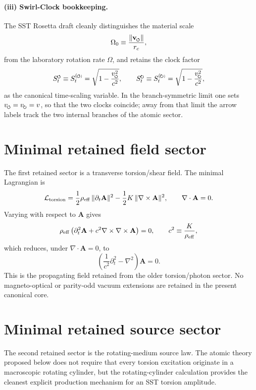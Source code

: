 \documentclass[11pt,a4paper]{article}
\newcommand{\swirlarrow}{\mathchoice{\mkern-2mu\scriptstyle\boldsymbol{\circlearrowleft}}{\mkern-2mu\scriptstyle\boldsymbol{\circlearrowleft}}{\mkern-2mu\scriptscriptstyle\boldsymbol{\circlearrowleft}}{\mkern-2mu\scriptscriptstyle\boldsymbol{\circlearrowleft}}}
\newcommand{\swirlarrowcw}{\mathchoice{\mkern-2mu\scriptstyle\boldsymbol{\circlearrowright}}{\mkern-2mu\scriptstyle\boldsymbol{\circlearrowright}}{\mkern-2mu\scriptscriptstyle\boldsymbol{\circlearrowright}}{\mkern-2mu\scriptscriptstyle\boldsymbol{\circlearrowright}}}
\newcommand{\vswirl}{\mathbf{v}_{\swirlarrow}}
\newcommand{\SwirlClock}{S_t^{\swirlarrow}}
\newcommand{\SwirlClockcw}{S_t^{\swirlarrowcw}}
\newcommand{\rc}{r_c}
\begin{document}
\paragraph{(iii) Swirl-Clock bookkeeping.} The SST Rosetta draft cleanly distinguishes the material scale
\begin{equation}
\label{eq:Omega0}
\Omega_0 \equiv \frac{\lVert \vswirl\rVert}{\rc},
\end{equation}
from the laboratory rotation rate $\Omega$, and retains the clock factor
\begin{equation}
\label{eq:SwirlClock}
\SwirlClock \equiv S_t^{(\swirlarrow)} = \sqrt{1-\frac{v_{\swirlarrow}^{2}}{c^2}},
\qquad
\SwirlClockcw \equiv S_t^{(\swirlarrowcw)} = \sqrt{1-\frac{v_{\swirlarrowcw}^{2}}{c^2}},
\end{equation}
as the canonical time-scaling variable. In the branch-symmetric limit one sets $v_{\swirlarrow}=v_{\swirlarrowcw}=v$, so that the two clocks coincide; away from that limit the arrow labels track the two internal branches of the atomic sector.

\section{Minimal retained field sector}
The first retained sector is a transverse torsion/shear field. The minimal Lagrangian is
\begin{equation}
\label{eq:Ltorsion}
\mathcal{L}_{\rm torsion}
=
\frac12\rho_{\rm eff}\,\lVert \partial_t \mathbf{A}\rVert^2
-
\frac12 K\,\lVert \nabla\times\mathbf{A}\rVert^2,
\qquad
\nabla\cdot\mathbf{A}=0.
\end{equation}
Varying with respect to $\mathbf{A}$ gives
\begin{equation}
\label{eq:Awave-pre}
\rho_{\rm eff}\left(\partial_t^2\mathbf{A}+c^2\nabla\times\nabla\times\mathbf{A}\right)=0,
\qquad
c^2\equiv \frac{K}{\rho_{\rm eff}},
\end{equation}
which reduces, under $\nabla\cdot\mathbf{A}=0$, to
\begin{equation}
\label{eq:Awave}
\boxed{
\left(\frac{1}{c^2}\partial_t^2-\nabla^2\right)\mathbf{A}=0.
}
\end{equation}
This is the propagating field retained from the older torsion/photon sector. No magneto-optical or parity-odd vacuum extensions are retained in the present canonical core.

\section{Minimal retained source sector}
The second retained sector is the rotating-medium source law. The atomic theory proposed below does not require that every torsion excitation originate in a macroscopic rotating cylinder, but the rotating-cylinder calculation provides the cleanest explicit production mechanism for an SST torsion amplitude.
\end{document}
